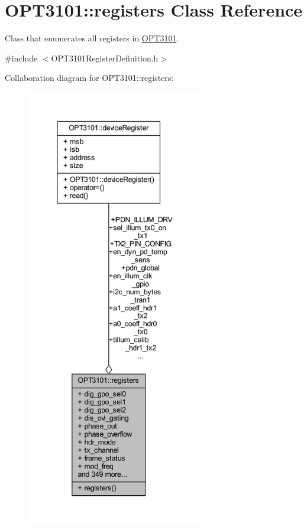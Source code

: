 \hypertarget{class_o_p_t3101_1_1registers}{}\section{O\+P\+T3101\+:\+:registers Class Reference}
\label{class_o_p_t3101_1_1registers}


Class that enumerates all registers in \mbox{\hyperlink{namespace_o_p_t3101}{O\+P\+T3101}}.  




{\ttfamily \#include $<$O\+P\+T3101\+Register\+Definition.\+h$>$}



Collaboration diagram for O\+P\+T3101\+:\+:registers\+:\nopagebreak
\begin{figure}[H]
\begin{center}
\leavevmode
\includegraphics[height=550pt]{class_o_p_t3101_1_1registers__coll__graph}
\end{center}
\end{figure}

